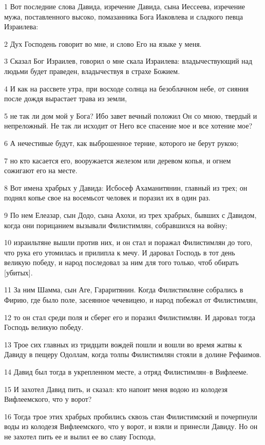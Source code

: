 \par 1 Вот последние слова Давида, изречение Давида, сына Иессеева, изречение мужа, поставленного высоко, помазанника Бога Иаковлева и сладкого певца Израилева:
\par 2 Дух Господень говорит во мне, и слово Его на языке у меня.
\par 3 Сказал Бог Израилев, говорил о мне скала Израилева: владычествующий над людьми будет праведен, владычествуя в страхе Божием.
\par 4 И как на рассвете утра, при восходе солнца на безоблачном небе, от сияния после дождя вырастает трава из земли,
\par 5 не так ли дом мой у Бога? Ибо завет вечный положил Он со мною, твердый и непреложный. Не так ли исходит от Него все спасение мое и все хотение мое?
\par 6 А нечестивые будут, как выброшенное терние, которого не берут рукою;
\par 7 но кто касается его, вооружается железом или деревом копья, и огнем сожигают его на месте.
\par 8 Вот имена храбрых у Давида: Исбосеф Ахаманитянин, главный из трех; он поднял копье свое на восемьсот человек и поразил их в один раз.
\par 9 По нем Елеазар, сын Додо, сына Ахохи, из трех храбрых, бывших с Давидом, когда они порицанием вызывали Филистимлян, собравшихся на войну;
\par 10 израильтяне вышли против них, и он стал и поражал Филистимлян до того, что рука его утомилась и прилипла к мечу. И даровал Господь в тот день великую победу, и народ последовал за ним для того только, чтоб обирать [убитых].
\par 11 За ним Шамма, сын Аге, Гараритянин. Когда Филистимляне собрались в Фирию, где было поле, засеянное чечевицею, и народ побежал от Филистимлян,
\par 12 то он стал среди поля и сберег его и поразил Филистимлян. И даровал тогда Господь великую победу.
\par 13 Трое сих главных из тридцати вождей пошли и вошли во время жатвы к Давиду в пещеру Одоллам, когда толпы Филистимлян стояли в долине Рефаимов.
\par 14 Давид был тогда в укрепленном месте, а отряд Филистимлян--в Вифлееме.
\par 15 И захотел Давид пить, и сказал: кто напоит меня водою из колодезя Вифлеемского, что у ворот?
\par 16 Тогда трое этих храбрых пробились сквозь стан Филистимский и почерпнули воды из колодезя Вифлеемского, что у ворот, и взяли и принесли Давиду. Но он не захотел пить ее и вылил ее во славу Господа,
